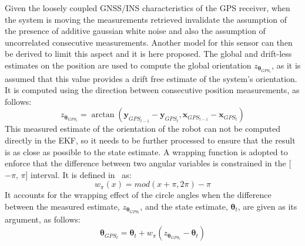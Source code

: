 Given the loosely coupled GNSS/INS characteristics of the \gls{GPS} receiver, when the system is moving the measurements retrieved invalidate the assumption of the presence of additive gaussian white noise and also the assumption of uncorrelated consecutive measurements.
Another model for this sensor can then be derived to limit this aspect and it is here proposed. 
The global and drift-less estimates on the position are used to compute the global orientation $z_{\boldsymbol \theta_{GPS_t}}$, as it is assumed that this value provides a drift free estimate of the system's orientation.
It is computed using the direction between consecutive position measurements, as follows:
\begin{equation}
z_{\boldsymbol \theta_{GPS_t}} = \arctan(\mathbf{y}_{GPS_{t-1}} - \mathbf{y}_{GPS_t}, \mathbf{x}_{GPS_{t-1}} - \mathbf{x}_{GPS_t} )
\end{equation}
This measured estimate of the orientation of the robot can not be computed directly in the \gls{EKF}, so it needs to be further processed to ensure that the result is as close as possible to the state estimate.
A wrapping function is adopted to enforce that the difference between two angular variables is constrained in the [$-\pi$, $\pi$] interval.
It is defined in~\cite{markovic_wrapping_2017} as:
    \begin{equation}
    w_{\pi}(x) = mod(x + \pi, 2\pi) - \pi
    \end{equation}
It accounts for the wrapping effect of the circle angles when the difference between the measured estimate, $z_{\boldsymbol \theta_{GPS_t}}$, and the state estimate, $\boldsymbol \theta_{t}$, are given as its argument, as follows:
\begin{equation}
	\boldsymbol \theta_{GPS_t} = \boldsymbol \theta_{t} + w_{\pi}(z_{\boldsymbol \theta_{GPS_t}} - \boldsymbol \theta_{t})
\end{equation}


